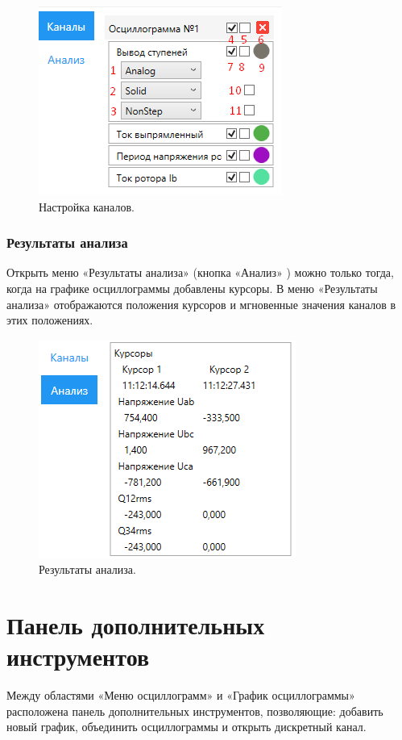 \documentclass[a4paper,12pt]{article}
\begin{document}
 
\begin{figure}[h] 
\centering 
\includegraphics[width=40ex]{image/Channel.png} 
\caption{Настройка каналов.} 
\end{figure} 
 
 
\subsubsection*{\hspace{.5cm} Результаты анализа } 
\hspace{.5cm} Открыть меню «Результаты анализа» (кнопка «Анализ» ) можно только тогда, когда на графике осциллограммы добавлены курсоры.  
В меню «Результаты анализа» отображаются положения курсоров и мгновенные значения каналов в этих положениях. 
 
 
\begin{figure}[h] 
\centering 
\includegraphics[width=40ex]{image/Screenshot_8.png} 
\caption{Результаты анализа.} 
\end{figure} 
 
 
 
 
 
 
\section*{\hspace{.5cm} Панель дополнительных инструментов} 
\hspace{.5cm}Между областями «Меню осциллограмм» и «График осциллограммы» расположена панель дополнительных инструментов, позволяющие: добавить новый график, объединить осциллограммы и открыть дискретный канал. 
 
\end{document}
